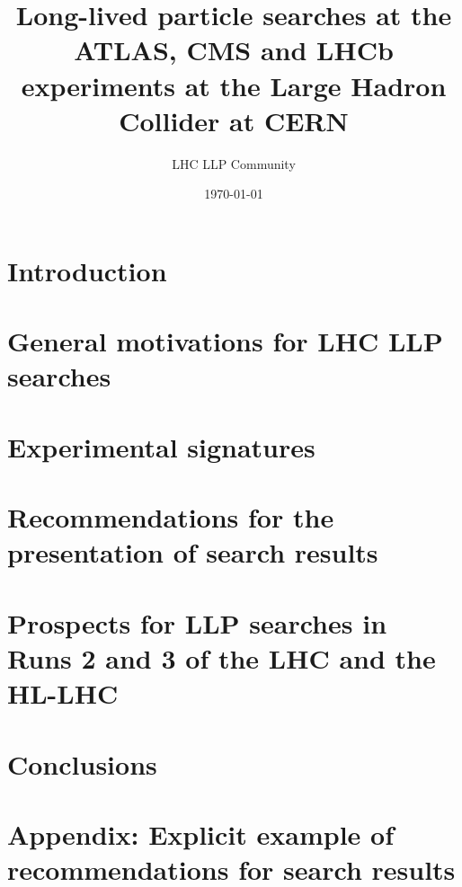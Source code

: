 \documentclass[a4paper,debug,notitlepage,nobib]{tufte-book}
\title{Long-lived particle searches at the ATLAS, CMS and LHCb \\ \smallskip \noindent experiments at the Large Hadron Collider at CERN}
\author{LHC LLP Community}
\date{\today}
\begin{document}
\setcounter{secnumdepth}{3} %



\setcounter{tocdepth}{3}
\tableofcontents
 
\pagebreak

\chapter{Introduction}
\label{sec:Introduction}


\chapter{General motivations for LHC LLP searches}
\label{sec:motivation}


\chapter{Experimental signatures}
\label{sec:signatures}


\chapter{Recommendations for the presentation of search results}
\label{sec:recommendations}


\chapter{Prospects for LLP searches in Runs 2 and 3 of the LHC and the HL-LHC}
\label{sec:future} 


\chapter{Conclusions}
\label{sec:conclusions}

 


\appendix

%

\chapter{Appendix: Explicit example of recommendations for search results}
\label{app:ExampleRec_Appendix}


%
% 
%
%
%
%
%
\printbibliography
\end{document}
